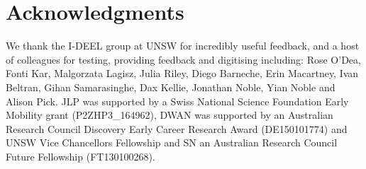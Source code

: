 \documentclass[article]{jss}
\begin{document}
\section*{Acknowledgments}
We thank the I-DEEL group at UNSW for incredibly useful feedback, and a host of colleagues for testing, providing feedback and digitising including: Rose O'Dea, Fonti Kar, Malgorzata Lagisz, Julia Riley, Diego Barneche, Erin Macartney, Ivan Beltran, Gihan Samarasinghe, Dax Kellie, Jonathan Noble, Yian Noble and Alison Pick. JLP was supported by a Swiss National Science Foundation Early Mobility grant (P2ZHP3\_164962), DWAN was supported by an Australian Research Council Discovery Early Career Research Award (DE150101774) and UNSW Vice Chancellors Fellowship and SN an Australian Research Council Future Fellowship (FT130100268). 



\end{document}
